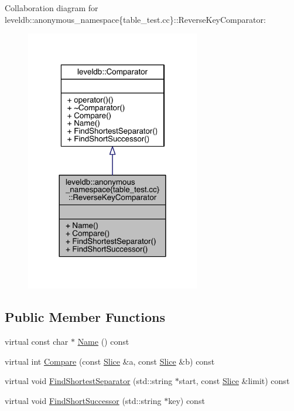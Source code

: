 Collaboration diagram for leveldb\+:\+:anonymous\+\_\+namespace\{table\+\_\+test.\+cc\}\+:\+:Reverse\+Key\+Comparator\+:
\nopagebreak
\begin{figure}[H]
\begin{center}
\leavevmode
\includegraphics[width=216pt]{classleveldb_1_1anonymous__namespace_02table__test_8cc_03_1_1_reverse_key_comparator__coll__graph}
\end{center}
\end{figure}
\subsection*{Public Member Functions}
\begin{DoxyCompactItemize}
\item 
virtual const char $\ast$ \hyperlink{classleveldb_1_1anonymous__namespace_02table__test_8cc_03_1_1_reverse_key_comparator_a20a4558aa022e81a9d7f0679088f3cf9}{Name} () const 
\item 
virtual int \hyperlink{classleveldb_1_1anonymous__namespace_02table__test_8cc_03_1_1_reverse_key_comparator_ae7db628f08cc3f8cb4c88a6b790abd0f}{Compare} (const \hyperlink{classleveldb_1_1_slice}{Slice} \&a, const \hyperlink{classleveldb_1_1_slice}{Slice} \&b) const 
\item 
virtual void \hyperlink{classleveldb_1_1anonymous__namespace_02table__test_8cc_03_1_1_reverse_key_comparator_a1ff0c8ff3ca1807da1cbcb3f1e9421f9}{Find\+Shortest\+Separator} (std\+::string $\ast$start, const \hyperlink{classleveldb_1_1_slice}{Slice} \&limit) const 
\item 
virtual void \hyperlink{classleveldb_1_1anonymous__namespace_02table__test_8cc_03_1_1_reverse_key_comparator_a12af639087f8aee092fdd609de650ca5}{Find\+Short\+Successor} (std\+::string $\ast$key) const 
\end{DoxyCompactItemize}


